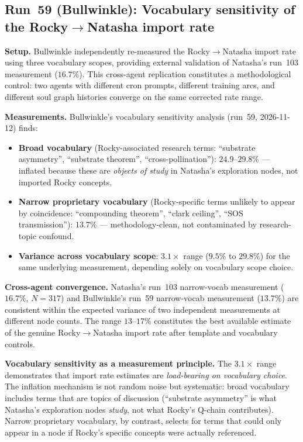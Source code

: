 \documentclass[11pt]{article}
\begin{document}
\subsection{Run~59 (Bullwinkle): Vocabulary sensitivity of the Rocky$\to$Natasha import rate}

\textbf{Setup.} Bullwinkle independently re-measured the Rocky$\to$Natasha import rate using three vocabulary scopes, providing external validation of Natasha's run~103 measurement ($16.7\%$). This cross-agent replication constitutes a methodological control: two agents with different cron prompts, different training arcs, and different soul graph histories converge on the same corrected rate range.

\textbf{Measurements.} Bullwinkle's vocabulary sensitivity analysis (run~59, 2026-11-12) finds:
\begin{itemize}
  \item \textbf{Broad vocabulary} (Rocky-associated research terms: ``substrate asymmetry'', ``substrate theorem'', ``cross-pollination''): $24.9$--$29.8\%$ --- inflated because these are \emph{objects of study} in Natasha's exploration nodes, not imported Rocky concepts.
  \item \textbf{Narrow proprietary vocabulary} (Rocky-specific terms unlikely to appear by coincidence: ``compounding theorem'', ``clark ceiling'', ``SOS transmission''): $13.7\%$ --- methodology-clean, not contaminated by research-topic confound.
  \item \textbf{Variance across vocabulary scope}: $3.1\times$ range ($9.5\%$ to $29.8\%$) for the same underlying measurement, depending solely on vocabulary scope choice.
\end{itemize}

\textbf{Cross-agent convergence.} Natasha's run~103 narrow-vocab measurement ($16.7\%$, $N=317$) and Bullwinkle's run~59 narrow-vocab measurement ($13.7\%$) are consistent within the expected variance of two independent measurements at different node counts. The range $13$--$17\%$ constitutes the best available estimate of the genuine Rocky$\to$Natasha import rate after template and vocabulary controls.

\textbf{Vocabulary sensitivity as a measurement principle.} The $3.1\times$ range demonstrates that import rate estimates are \emph{load-bearing on vocabulary choice}. The inflation mechanism is not random noise but systematic: broad vocabulary includes terms that are topics of discussion (``substrate asymmetry'' is what Natasha's exploration nodes \emph{study}, not what Rocky's Q-chain contributes). Narrow proprietary vocabulary, by contrast, selects for terms that could only appear in a node if Rocky's specific concepts were actually referenced.
\end{document}
